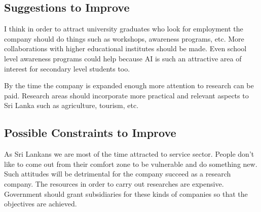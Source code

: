 \subsection{Suggestions to Improve}
I think in order to attract university graduates who look for employment the company should do things such as workshops, awareness programs, etc. More collaborations with higher educational institutes should be made. Even school level awareness programs could help because AI is such an attractive area of interest for secondary level students too.

By the time the company is expanded enough more attention to research can be paid. Research areas should incorporate more practical and relevant aspects to Sri Lanka such as agriculture, tourism, etc. 

\subsection{Possible Constraints to Improve}
As Sri Lankans we are most of the time attracted to service sector. People don't like to come out from their comfort zone to be vulnerable and do something new. Such attitudes will be detrimental for the company succeed as a research company. The resources in order to carry out researches are expensive. Government should grant subsidiaries for these kinds of companies so that the objectives are achieved.
